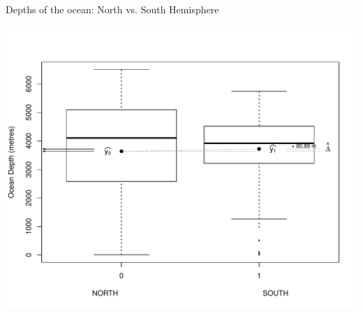 \documentclass[handout]{beamer}\usepackage[]{graphicx}\usepackage[]{color}
\newenvironment{knitrout}{}{} %
\begin{document}
\begin{frame}[fragile]{Depths of the ocean: North vs. South Hemisphere}

\begin{knitrout}\tiny
{}\color{fgcolor}

{\centering \includegraphics[width=1\linewidth]{figure/unnamed-chunk-2-1} 

}



\end{knitrout}


\end{frame}
\end{document}
